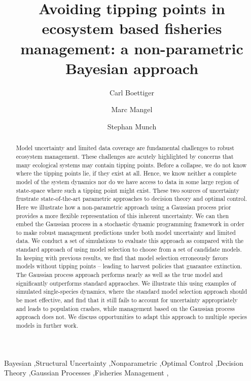 \documentclass[author-year, 12pt,review]{elsarticle} %
\begin{document}
\begin{frontmatter}

  \title{Avoiding tipping points in ecosystem based fisheries management: a
non-parametric Bayesian approach}
    \author[cstar]{Carl Boettiger}
    \author[cstar]{Marc Mangel}
  
  
    \author[noaa]{Stephan Munch}
  
  
      \address[cstar]{Center for Stock Assessment Research, Department of Applied Math and
Statistics, University of California, Mail Stop SOE-2, Santa Cruz, CA
95064, USA}    
    \address[noaa]{Southwest Fisheries Science Center, National Oceanic and Atmospheric
Administration, 110 Shaffer Road, Santa Cruz, CA 95060, USA}    
  
  \begin{abstract}
  Model uncertainty and limited data coverage are fundamental challenges
  to robust ecosystem management. These challenges are acutely highlighted
  by concerns that many ecological systems may contain tipping points.
  Before a collapse, we do not know where the tipping points lie, if they
  exist at all. Hence, we know neither a complete model of the system
  dynamics nor do we have access to data in some large region of
  state-space where such a tipping point might exist. These two sources of
  uncertainty frustrate state-of-the-art parametric approaches to decision
  theory and optimal control. Here we illustrate how a non-parametric
  approach using a Gaussian process prior provides a more flexible
  representation of this inherent uncertainty. We can then embed the
  Gaussian process in a stochastic dynamic programming framework in order
  to make robust management predictions under both model uncertainty and
  limited data. We conduct a set of simulations to evaluate this approach
  as compared with the standard approach of using model selection to
  choose from a set of candidate models. In keeping with previous results,
  we find that model selection erroneously favors models without tipping
  points -- leading to harvest policies that guarantee extinction. The
  Gaussian process approach performs nearly as well as the true model and
  significantly outperforms standard appraoches. We illustrate this using
  examples of simulated single-species dynamics, where the standard model
  selection approach should be most effective, and find that it still
  fails to account for uncertainty appropriately and leads to population
  crashes, while management based on the Gaussian process approach does
  not. We discuss opportunities to adapt this approach to multiple species
  models in further work.
  \end{abstract}
   \begin{keyword} Bayesian \sep Structural Uncertainty \sep Nonparametric \sep Optimal Control \sep Decision Theory \sep Gaussian Processes \sep Fisheries Management \sep \end{keyword}
 \end{frontmatter}
\end{document}
